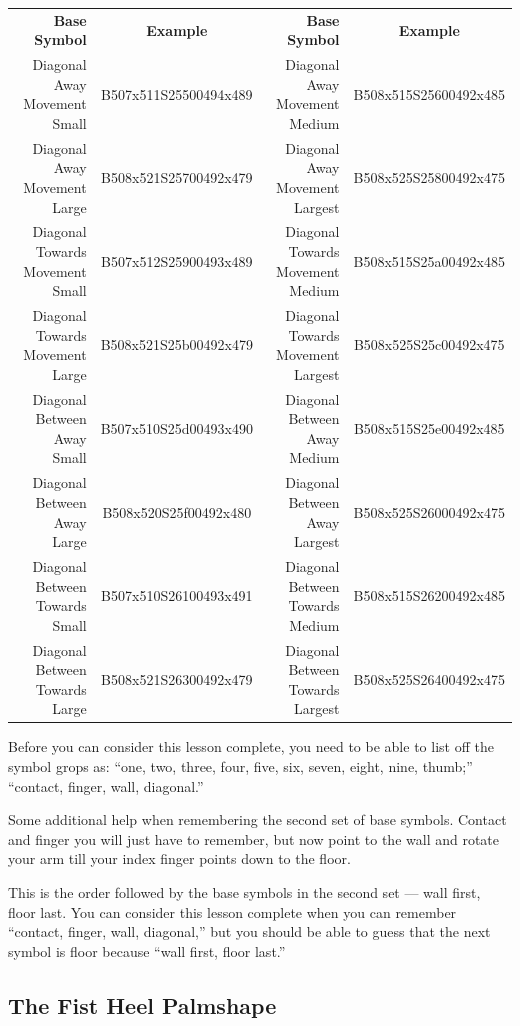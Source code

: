 \documentclass{article}
\begin{document}
\begin{center}
\begin{tabular}{rcrc}
\textbf{Base Symbol}&\textbf{Example}&\textbf{Base Symbol}&\textbf{Example}\\
Diagonal Away Movement Small   &B507x511S25500494x489&Diagonal Away Movement Medium    &B508x515S25600492x485\\
Diagonal Away Movement Large   &B508x521S25700492x479&Diagonal Away Movement Largest   &B508x525S25800492x475\\
Diagonal Towards Movement Small&B507x512S25900493x489&Diagonal Towards Movement Medium &B508x515S25a00492x485\\
Diagonal Towards Movement Large&B508x521S25b00492x479&Diagonal Towards Movement Largest&B508x525S25c00492x475\\
Diagonal Between Away Small    &B507x510S25d00493x490&Diagonal Between Away Medium     &B508x515S25e00492x485\\
Diagonal Between Away Large    &B508x520S25f00492x480&Diagonal Between Away Largest    &B508x525S26000492x475\\
Diagonal Between Towards Small &B507x510S26100493x491&Diagonal Between Towards Medium  &B508x515S26200492x485\\
Diagonal Between Towards Large &B508x521S26300492x479&Diagonal Between Towards Largest &B508x525S26400492x475\\
\end{tabular}
\end{center}

Before you can consider this lesson complete, you need to be able to list off the symbol grops as:
``one, two, three, four, five, six, seven, eight, nine, thumb;''
``contact, finger, wall, diagonal.''

Some additional help when remembering the second set of base symbols.
Contact and finger you will just have to remember, but now point to the wall and rotate your arm till your index finger points down to the floor.

This is the order followed by the base symbols in the second set --- wall first, floor last.
You can consider this lesson complete when you can remember ``contact, finger, wall, diagonal,'' but you should be able to guess that the next symbol is floor because ``wall first, floor last.''

\subsection{The Fist Heel Palmshape}
\end{document}
